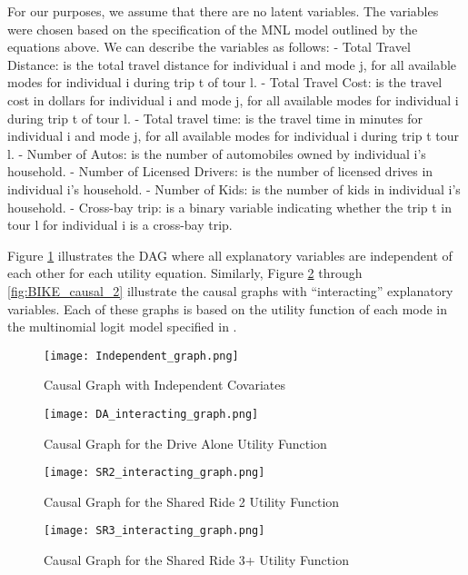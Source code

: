 For our purposes, we assume that there are no latent variables.
The variables were chosen based on the specification of the MNL model outlined by the equations above.
We can describe the variables as follows:
- Total Travel Distance: is the total travel distance for individual i and mode j, for all available modes for individual i during trip t of tour l.
- Total Travel Cost: is the travel cost in dollars for individual i and mode j, for all available modes for individual i during trip t of tour l.
- Total travel time: is the travel time in minutes for individual i and mode j, for all available modes for individual i during trip t tour l.
- Number of Autos: is the number of automobiles owned by individual i's household.
- Number of Licensed Drivers: is the number of licensed drives in individual i's household.
- Number of Kids: is the number of kids in individual i's household.
- Cross-bay trip: is a binary variable indicating whether the trip t in tour l for individual i is a cross-bay trip.

Figure \ref{fig:IND_GRAPH} illustrates the DAG where all explanatory variables are independent of each other for each utility equation.
Similarly, Figure \ref{fig:DA_causal_2} through \ref{fig:BIKE_causal_2} illustrate the causal graphs with ``interacting'' explanatory variables.
Each of these graphs is based on the utility function of each mode in the multinomial logit model specified in \citet{brathwaite_asymmetric}.

\begin{figure}
   \centering
   \texttt{[image: Independent\_graph.png]}
   \caption{Causal Graph with Independent Covariates}
   \label{fig:IND_GRAPH}
\end{figure}

\begin{figure}
   \centering
   \texttt{[image: DA\_interacting\_graph.png]}
   \caption{Causal Graph for the Drive Alone Utility Function}
   \label{fig:DA_causal_2}
\end{figure}

\begin{figure}
   \centering
   \texttt{[image: SR2\_interacting\_graph.png]}
   \caption{Causal Graph for the Shared Ride 2 Utility Function}
   \label{fig:SR2_causal_2}
\end{figure}

\begin{figure}
   \centering
   \texttt{[image: SR3\_interacting\_graph.png]}
   \caption{Causal Graph for the Shared Ride 3+ Utility Function}
   \label{fig:SR3_causal_2}
\end{figure}

